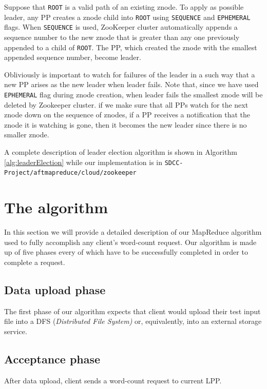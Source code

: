 \documentclass[sigchi]{acmart}
\begin{document}
Suppose that \texttt{ROOT} is a valid path of an existing znode. To apply as possible leader, any PP creates a znode child into \texttt{ROOT} using \texttt{SEQUENCE} and \texttt{EPHEMERAL} flags. When \texttt{SEQUENCE} is used, ZooKeeper cluster automatically appends a sequence number to the new znode that is greater than any one previously appended to a child of \texttt{ROOT}. The PP, which created the znode with the smallest appended sequence number, become leader.

Obliviously is important to watch for failures of the leader in a such way that a new PP arises as the new leader when leader fails. Note that, since we have used \texttt{EPHEMERAL} flag during znode creation, when leader fails the smallest znode will be deleted by Zookeeper cluster. if we make sure that all PPs watch for the next znode down on the sequence of znodes, if a PP receives a notification that the znode it is watching is gone, then it becomes the new leader since there is no smaller znode. 

A complete description of leader election algorithm is shown in Algorithm \ref{alg:leaderElection} while our implementation is in \texttt{SDCC-Project/aftmapreduce/cloud/zookeeper}

\section{The algorithm}

In this section we will provide a detailed description of our MapReduce algorithm used to fully accomplish any client's word-count request. Our algorithm is made up of five phases every of which have to be successfully completed in order to complete a request.

\subsection{Data upload phase}

The first phase of our algorithm expects that client would upload their test input file into a DFS (\textit{Distributed File System)} or, equivalently, into an external storage service.



\subsection{Acceptance phase}

After data upload, client sends a word-count request to current LPP. 
\end{document}
